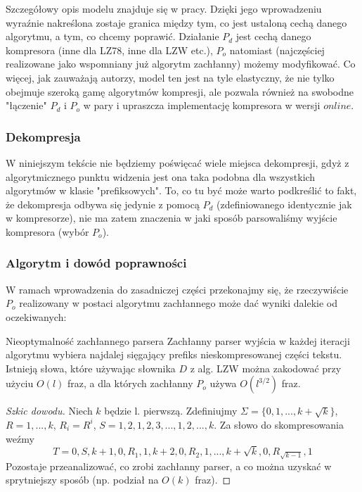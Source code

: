 Szczegółowy opis modelu znajduje się w pracy. Dzięki jego wprowadzeniu wyraźnie nakreślona zostaje granica między tym, co jest ustaloną cechą danego algorytmu, a tym, co chcemy poprawić. Działanie $P_{d}$ jest cechą danego kompresora (inne dla LZ78, inne dla LZW etc.), $P_{o}$ natomiast (najczęściej realizowane jako wspomniany już algorytm zachłanny) możemy modyfikować.
Co więcej, jak zauważają autorzy, model ten jest na tyle elastyczny, że nie tylko obejmuje szeroką gamę algorytmów kompresji, ale pozwala również na swobodne "łączenie" $P_{d}$ i $P_{o}$ w pary i upraszcza implementację kompresora w wersji $online$.
\subsubsection{Dekompresja}
W niniejszym tekście nie będziemy poświęcać wiele miejsca dekompresji, gdyż z algorytmicznego punktu widzenia jest ona taka podobna dla wszystkich algorytmów w klasie "prefiksowych". To, co tu być może warto podkreślić to fakt, że dekompresja odbywa się jedynie z pomocą $P_{d}$ (zdefiniowanego identycznie jak w kompresorze), nie ma zatem znaczenia w jaki sposób parsowaliśmy wyjście kompresora (wybór $P_{o}$).

\subsubsection{Algorytm i dowód poprawności}
W ramach wprowadzenia do zasadniczej części przekonajmy się, że rzeczywiście  $P_{o}$ realizowany w postaci algorytmu zachłannego może dać wyniki dalekie od oczekiwanych:

\begin{theorem}{}{Nieoptymalność zachłannego parsera \cite{matias1999optimality}}
Zachłanny parser wyjścia w każdej iteracji algorytmu wybiera najdalej sięgający prefiks nieskompresowanej części tekstu. Istnieją słowa, które używając słownika $D$ z alg. LZW można zakodować przy użyciu $O(l)$ fraz, a dla których zachłanny $P_{o}$ używa $O(l^{3/2})$ fraz.
\end{theorem}
\begin{proof}[Szkic dowodu]
Niech $k$ będzie l. pierwszą. Zdefiniujmy $\Sigma=\{0,1,...,k+\sqrt{k}\}$, $R=1,...,k$, $R_{i} = R^{i}$, $S=1,2,1,2,3,...,1,2,...,k$. Za słowo do skompresowania weźmy \[T=0,S,k+1,0,R_{1},1,k+2,0,R_{2},1,...,k+\sqrt{k},0,R_{\sqrt{k-1}},1\]
Pozostaje przeanalizować, co zrobi zachłanny parser, a co można uzyskać w sprytniejszy sposób (np. podział na $O(k)$ fraz).
\end{proof}

